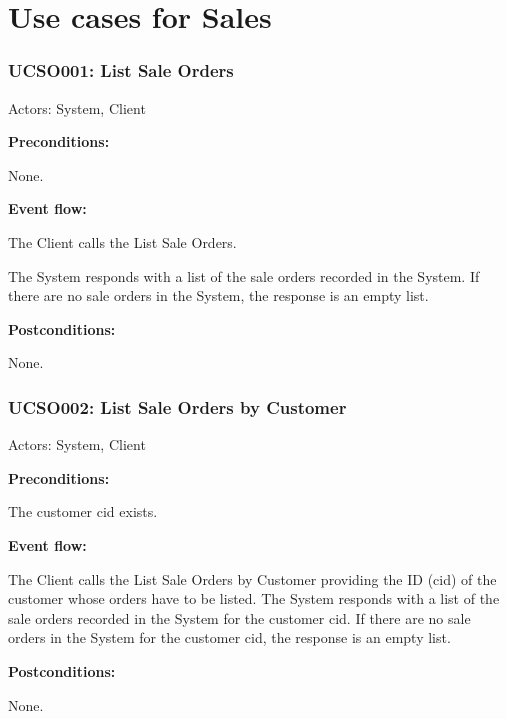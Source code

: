 \section{Use cases for Sales}

\begin{ucbox}{\subsubsection{UCSO001: List Sale Orders}}
\label{UCSO001}

Actors: System, Client

\textbf{Preconditions:}

\ucitem None.

\textbf{Event flow:}

\ucitem The Client calls the List Sale Orders.

\ucitem The System responds with a list of the sale orders recorded in the System. If there are no sale orders in the System, the response is an empty list.

\textbf{Postconditions:}

\ucitem None.

\end{ucbox}

\begin{ucbox}{\subsubsection{UCSO002: List Sale Orders by Customer}}
\label{UCSO002}

Actors: System, Client

\textbf{Preconditions:}

\ucitem The customer cid exists.

\textbf{Event flow:}

\ucitem The Client calls the List Sale Orders by Customer providing the ID (cid) of the customer whose orders have to be listed.
\ucitem The System responds with a list of the sale orders recorded in the System for the customer cid. If there are no sale orders in the System for the customer cid, the 
response is an empty list.

\textbf{Postconditions:}

\ucitem None.

\end{ucbox}


